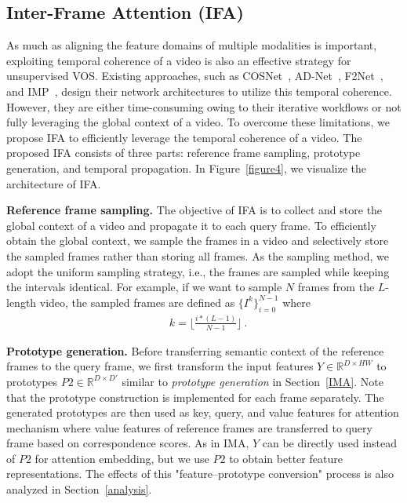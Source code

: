 \documentclass[10pt,twocolumn,letterpaper]{article}
\begin{document}
\subsection{Inter-Frame Attention (IFA)}
As much as aligning the feature domains of multiple modalities is important, exploiting temporal coherence of a video is also an effective strategy for unsupervised VOS. Existing approaches, such as COSNet~\cite{COSNet}, AD-Net~\cite{AD-Net}, F2Net~\cite{F2Net}, and IMP~\cite{IMP}, design their network architectures to utilize this temporal coherence. However, they are either time-consuming owing to their iterative workflows or not fully leveraging the global context of a video. To overcome these limitations, we propose IFA to efficiently leverage the temporal coherence of a video. The proposed IFA consists of three parts: reference frame sampling, prototype generation, and temporal propagation. In Figure~\ref{figure4}, we visualize the architecture of IFA.



\vspace{1mm}
\noindent\textbf{Reference frame sampling.} The objective of IFA is to collect and store the global context of a video and propagate it to each query frame. To efficiently obtain the global context, we sample the frames in a video and selectively store the sampled frames rather than storing all frames. As the sampling method, we adopt the uniform sampling strategy, i.e., the frames are sampled while keeping the intervals identical. For example, if we want to sample $N$ frames from the $L$-length video, the sampled frames are defined as $\{I^k\}_{i=0}^{N-1}$ where
\begin{align}
&k = \lfloor\frac{i * (L - 1)}{N - 1}\rfloor~.
\end{align}



\vspace{1mm}
\noindent\textbf{Prototype generation.} Before transferring semantic context of the reference frames to the query frame, we first transform the input features $Y \in \mathbb{R}^{D \times HW}$ to prototypes $P2 \in \mathbb{R}^{D \times D'}$ similar to \textit{prototype generation} in Section~\ref{IMA}. Note that the prototype construction is implemented for each frame separately. The generated prototypes are then used as key, query, and value features for attention mechanism where value features of reference frames are transferred to query frame based on correspondence scores. As in IMA, $Y$ can be directly used instead of $P2$ for attention embedding, but we use $P2$ to obtain better feature representations. The effects of this "feature--prototype conversion" process is also analyzed in Section~\ref{analysis}.
\end{document}
